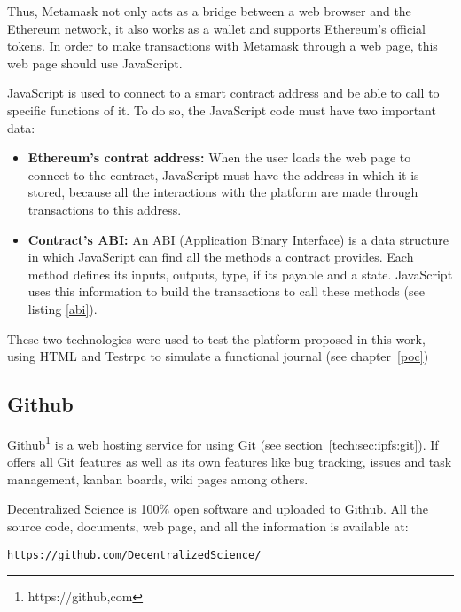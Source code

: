 Thus, Metamask not only acts as a bridge between a web browser and the Ethereum
network, it also works as a wallet and supports Ethereum's official tokens. In
order to make transactions with Metamask through a web page, this web page
should use JavaScript. 

JavaScript is used to connect to a smart contract address and be able to call to
specific functions of it. To do so, the JavaScript code must have two important
data:

\begin{itemize}
\item \textbf{Ethereum's contrat address:} When the user loads the web page to
  connect to the contract, JavaScript must have the address in which it is
  stored, because all the interactions with the platform are made through
  transactions to this address.
\item \textbf{Contract's ABI:} An ABI (Application Binary Interface) is a data
  structure in which JavaScript can find all the methods a contract provides. Each
  method defines its inputs, outputs, type, if its payable and a state.
  JavaScript uses this information to build the transactions to call these
  methods (see listing \ref{abi}).

\end{itemize}

These two technologies were used to test the platform proposed in this work,
using HTML and Testrpc to simulate a functional journal (see chapter~\ref{poc})





\subsection{Github}
\label{sec:github}

Github\footnote{https://github,com} is a web hosting service for  using
Git (see section~\ref{tech:sec:ipfs:git}). If offers all Git features as well as
its own features like bug tracking, issues and task management, kanban boards,
wiki pages among others.

Decentralized Science is 100\% open software and uploaded to Github. All the
source code, documents, web page, and all the information is available at:

\begin{lstlisting}[frame=single]
  https://github.com/DecentralizedScience/
\end{lstlisting}

